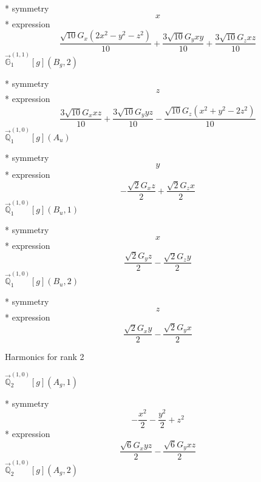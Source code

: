 \documentclass[fleqn,8pt]{jsarticle}
\begin{document}
\noindent\quad ** symmetry
\begin{dmath*}
x
\end{dmath*}
\noindent\quad ** expression
\begin{dmath*}
\frac{\sqrt{10} G_{x} \left(2 x^{2} - y^{2} - z^{2}\right)}{10} + \frac{3 \sqrt{10} G_{y} x y}{10} + \frac{3 \sqrt{10} G_{z} x z}{10}
\end{dmath*}
\noindent\quad $\vec{\mathbb{G}}_{1}^{(1,1)}[g](B_{g},2)$

\noindent\quad ** symmetry
\begin{dmath*}
z
\end{dmath*}
\noindent\quad ** expression
\begin{dmath*}
\frac{3 \sqrt{10} G_{x} x z}{10} + \frac{3 \sqrt{10} G_{y} y z}{10} - \frac{\sqrt{10} G_{z} \left(x^{2} + y^{2} - 2 z^{2}\right)}{10}
\end{dmath*}
\noindent\quad $\vec{\mathbb{Q}}_{1}^{(1,0)}[g](A_{u})$

\noindent\quad ** symmetry
\begin{dmath*}
y
\end{dmath*}
\noindent\quad ** expression
\begin{dmath*}
- \frac{\sqrt{2} G_{x} z}{2} + \frac{\sqrt{2} G_{z} x}{2}
\end{dmath*}
\noindent\quad $\vec{\mathbb{Q}}_{1}^{(1,0)}[g](B_{u},1)$

\noindent\quad ** symmetry
\begin{dmath*}
x
\end{dmath*}
\noindent\quad ** expression
\begin{dmath*}
\frac{\sqrt{2} G_{y} z}{2} - \frac{\sqrt{2} G_{z} y}{2}
\end{dmath*}
\noindent\quad $\vec{\mathbb{Q}}_{1}^{(1,0)}[g](B_{u},2)$

\noindent\quad ** symmetry
\begin{dmath*}
z
\end{dmath*}
\noindent\quad ** expression
\begin{dmath*}
\frac{\sqrt{2} G_{x} y}{2} - \frac{\sqrt{2} G_{y} x}{2}
\end{dmath*}

\noindent * Harmonics for rank 2

\noindent\quad $\vec{\mathbb{Q}}_{2}^{(1,0)}[g](A_{g},1)$

\noindent\quad ** symmetry
\begin{dmath*}
- \frac{x^{2}}{2} - \frac{y^{2}}{2} + z^{2}
\end{dmath*}
\noindent\quad ** expression
\begin{dmath*}
\frac{\sqrt{6} G_{x} y z}{2} - \frac{\sqrt{6} G_{y} x z}{2}
\end{dmath*}
\noindent\quad $\vec{\mathbb{Q}}_{2}^{(1,0)}[g](A_{g},2)$
\end{document}

